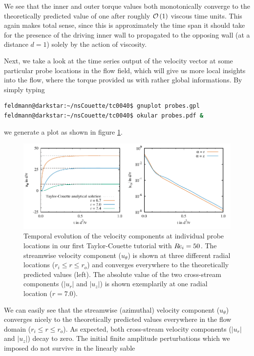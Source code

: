 \documentclass[a4paper, 11pt, DIV=11]{scrartcl}
\begin{document}
We see that the inner and outer torque values both monotonically converge to the
theoretically predicted value of one after roughly $\mathcal{O}\left(1\right)$
viscous time units. This again makes total sense, since this is approximately
the time span it should take for the presence of the driving inner wall to
propagated to the opposing wall (at a distance $d=1$) solely by the action of
viscosity. %
\par
Next, we take a
look at the time series output of the velocity vector at some particular probe
locations in the flow field, which will give us more local insights into the
flow, where the torque provided us with rather global informations. By simply
typing
\begin{lstlisting}[language=bash]
feldmann@darkstar:~/nsCouette/tc0040$ gnuplot probes.gpl
feldmann@darkstar:~/nsCouette/tc0040$ okular probes.pdf &
\end{lstlisting}
we generate a plot as shown in figure \ref{fig:tc0040probes}.
\begin{figure}[htb]
\centering
\includegraphics[scale=1.00]{figures/tc0040/probes}
\caption{Temporal evolution of the velocity components at individual probe
locations in our first Taylor-Couette tutorial  with $R\hspace{-0.1em}e_{i}=\num{50}$.
The streamwise velocity component ($u_{\theta}$) is shown
at three different radial locations ($r_{i}\le r\le r_{o}$) and converges
everywhere to the theoretically predicted values (left). The absolute value of
the two cross-stream components ($|u_r|$ and $|u_z|$) is shown exemplarily at
one radial location ($r=\num{7.0}$).}
\label{fig:tc0040probes}
\end{figure}
We can easily see that the streamwise (azimuthal) velocity component
($u_{\theta}$) converges nicely to the theoretically predicted values everywhere
in the flow domain ($r_{i}\le r\le r_{o}$). As expected, both cross-stream
velocity components ($|u_r|$ and $|u_z|$) decay to zero. The initial finite
amplitude perturbations which we imposed do not survive in the linearly sable
\end{document}
